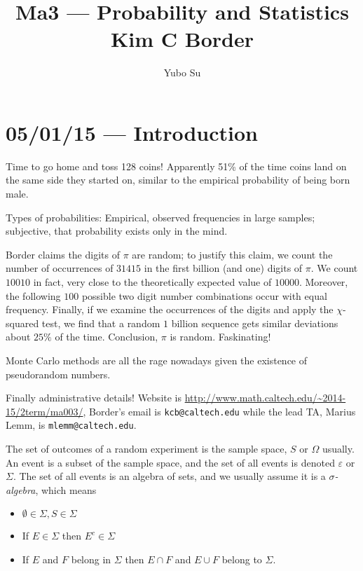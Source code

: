 \documentclass[10pt]{report}
\begin{document}
\title{Ma3 --- Probability and Statistics\\ Kim C Border}
\author{Yubo Su}
\date{}

\maketitle
\tableofcontents

\chapter{05/01/15 --- Introduction}

Time to go home and toss 128 coins! Apparently 51\% of the time coins land on the same side they started on, similar to the empirical probability of being born male.

Types of probabilities: Empirical, observed frequencies in large samples; subjective, that probability exists only in the mind.

Border claims the digits of $\pi$ are random; to justify this claim, we count the number of occurrences of $31415$ in the first billion (and one) digits of $\pi$. We count $10010$ in fact, very close to the theoretically expected value of $10000$. Moreover, the following $100$ possible two digit number combinations occur with equal frequency. Finally, if we examine the occurrences of the digits and apply the $\chi$-squared test, we find that a random $1$ billion sequence gets similar deviations about $25\%$ of the time. Conclusion, $\pi$ is random. Faskinating!

Monte Carlo methods are all the rage nowadays given the existence of pseudorandom numbers.

Finally administrative details! Website is \url{http://www.math.caltech.edu/~2014-15/2term/ma003/}, Border's email is \texttt{kcb@caltech.edu} while the lead TA, Marius Lemm, is \texttt{mlemm@caltech.edu}. 

The set of outcomes of a random experiment is the sample space, $S$ or $\Omega$ usually. An event is a subset of the sample space, and the set of all events is denoted $\varepsilon$ or $\Sigma$. The set of all events is an algebra of sets, and we usually assume it is a \emph{$\sigma$-algebra}, which means
\begin{itemize}
    \item $\emptyset \in \Sigma, S \in \Sigma$
    \item If $E \in \Sigma$ then $E^c \in \Sigma$
    \item If $E$ and $F$ belong in $\Sigma$ then $E\cap F$ and $E \cup F$ belong to $\Sigma$.
\end{itemize}
\end{document}
